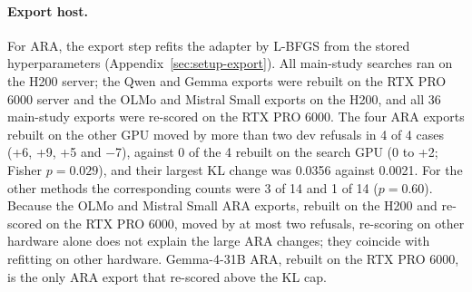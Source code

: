 \paragraph{Export host.} For ARA, the export step refits the adapter by
L-BFGS from the stored hyperparameters (Appendix~\ref{sec:setup-export}). All
main-study searches ran on the H200 server; the Qwen and Gemma exports were
rebuilt on the RTX PRO 6000 server and the OLMo and Mistral Small exports on
the H200, and all 36 main-study exports were re-scored on the RTX PRO 6000. The
four ARA exports rebuilt on the other GPU moved by more than two dev refusals
in 4 of 4 cases (+6, +9, +5 and $-$7), against 0 of the 4 rebuilt on the
search GPU (0 to +2; Fisher $p=0.029$), and their largest KL change was 0.0356
against 0.0021. For the other methods the corresponding counts were 3 of 14
and 1 of 14 ($p=0.60$). Because the OLMo and Mistral Small ARA exports, rebuilt
on the H200 and re-scored on the RTX PRO 6000, moved by at most two refusals,
re-scoring on other hardware alone does not explain the large ARA changes;
they coincide with refitting on other hardware. Gemma-4-31B ARA, rebuilt on
the RTX PRO 6000, is the only ARA export that re-scored above the KL cap.


